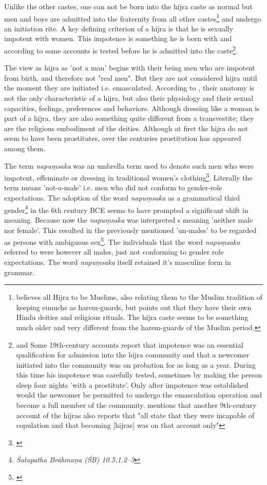Unlike the other castes, one can not be born into the hijra caste as normal but men and boys are admitted into the fraternity from all other castes\footnote{\cite{ibbetson} believes all Hijra to be Muslims, also relating them to the Muslim tradition of keeping eunuchs as harem-guards, but \cite{nanda} points out that they have their own Hindu deities and religious rituals. The hijra caste seems to be something much older and very different from the harem-guards of the Muslim period.} and undergo an initiation rite. A key defining criterion of a hijra is that he is sexually impotent with women. This impotence is something he is born with and according to some accounts is tested before he is admitted into the caste\footnote{\cite{shah} and \cite{bhimbhai} Some 19th-century accounts report that impotence was an essential qualification for admission into the hijra community and that a newcomer initiated into the community was on probation for as long as a year. During this time his impotence was carefully tested, sometimes by making the person sleep four nights 'with a prostitute'. Only after impotence was established would the newcomer be permitted to undergo the emasculation operation and become a full member of the community. \cite{preston} mentions that another 9th-century account of the hijras also reports that "all state that they were incapable of copulation and that becoming [hijras] was on that account only"}.

The view as hijra as 'not a man' begins with their being men who are impotent from birth, and therefore not "real men". But they are not considered hijra until the moment they are initiated i.e. emasculated. According to \cite{nanda}, their anatomy is not the only characteristic of a hijra, but also their physiology and their sexual capacities, feelings, preferences and behaviors. Although dressing like a woman is part of a hijra, they are also something quite different from a transvestite; they are the religious embodiment of the deities. Although at first the hijra do not seem to have been prostitutes, over the centuries prostitution has appeared among them.

The term {\em napuṃsaka} was an umbrella term used to denote such men who were impotent, effeminate or dressing in traditional women's clothing\footnote{\cite{zwilling}}. Literally the term means 'not-a-male' i.e. men who did not conform to gender-role expectations. The adoption of the word {\em napuṃsaka} as a grammatical third gender\footnote{{\em Śatapatha Brāhmaṇa (ŚB) 10.5.1.2–3}} in the 6th century BCE seems to have prompted a significant shift in meaning. Because now the {\em napuṃsaka} was interpreted s meaning 'neither male nor female'. This resulted in the previously mentioned 'un-males' to be regarded as persons with ambiguous sex\footnote{\cite{zwilling2000}}. The individuals that the word {\em napuṃsaka} referred to were however all males, just not conforming to gender role expectations. The word {\em napuṃsaka} itself retained it's masculine form in grammar.

